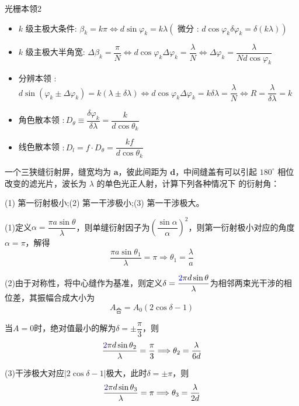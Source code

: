 \begin{mydef}{光栅本领}{2}
	\begin{itemize} 
	\item $k$ 级主极大条件: $\beta_k=k \pi \Leftrightarrow d \sin \varphi_k=k \lambda\left(\right.$ 微分 : $\left.d \cos \varphi_k \delta \varphi_k=\delta(k \lambda)\right)$
	\item $k$ 级主极大半角宽: $\Delta \beta_k=\dfrac{\pi}{N} \Leftrightarrow d \cos \varphi_k \Delta \varphi_k=\dfrac{\lambda}{N} \Leftrightarrow \Delta \varphi_k=\dfrac{\lambda}{N d \cos \varphi_k}$
	\item  分辨本领 : $d \sin \left(\varphi_k \pm \Delta \varphi_k\right)=k(\lambda \pm \delta \lambda) \Leftrightarrow d \cos \varphi_k \Delta \varphi_k=k \delta \lambda=\dfrac{\lambda}{N} \Leftrightarrow R=\dfrac{\lambda}{\delta \lambda}=k$
	\item  角色散本领 $: D_\theta \equiv \dfrac{\delta \varphi_k}{\delta \lambda}=\dfrac{k}{d \cos \theta_k}$
	\item  线色散本领 $: D_l=f \cdot D_\theta=\dfrac{k f}{d \cos \theta_k}$
	\end{itemize}
\end{mydef}

\begin{example}
	一个三狭缝衍射屏，缝宽均为 $\boldsymbol{a}$，彼此间距为 $\boldsymbol{d}$，中间缝盖有可以引起 $180^{\circ}$ 相位改变的滤光片，波长为 $\lambda$ 的单色光正人射，计算下列各种情况下 的衍射角：
	\par (1) 第一衍射极小;\quad  (2) 第一干涉极小;\quad  (3) 第一干涉极大。
	\soln

	\par (1)定义$\alpha=\dfrac{\pi a\sin \theta}{\lambda}$，则单缝衍射因子为$\left(\dfrac{\sin \alpha}{\alpha}\right)^2$，则第一衍射极小对应的角度$\alpha=\pi$，解得
	\[
		\dfrac{\pi a\sin \theta_1}{\lambda}=\pi\Longrightarrow \theta_{1}=\dfrac{\lambda}{a}	
	\]
	\par (2)由于对称性，将中心缝作为基准，则定义$\delta=\dfrac{\textcolor{blue}{2}\pi d\sin \theta}{\lambda}$为相邻两束光干涉的相位差，其振幅合成大小为
	\[
		A_{合}=A_{0}(2\cos \delta-1)	
	\]
	\par 当$A=0$时，绝对值最小的解为$\delta=\pm \dfrac{\pi}{3}$，则
	\[
		\dfrac{\textcolor{blue}{2}\pi d \sin \theta_2}{\lambda}=\dfrac{\pi}{3}\Longrightarrow\theta_2=\dfrac{\lambda}{6d}
	\]
	\par (3)干涉极大对应$|2\cos \delta -1|$极大，此时$\delta=\pm \pi$，则
	\[
		\dfrac{\textcolor{blue}{2}\pi d \sin \theta_3}{\lambda}=\pi\Longrightarrow\theta_3=\dfrac{\lambda}{2d}	
	\]
\end{example}

